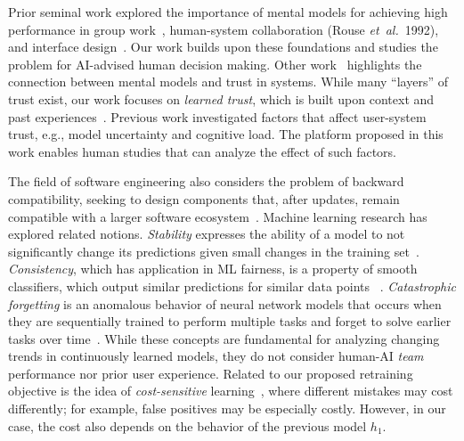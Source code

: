 \documentclass[letterpaper]{article}
\newcommand{\name}{AI-advised human decision making}
\newcommand{\hone}{\mbox{$h_1$}}
\newcommand{\etal}{\mbox{\it et al.}}
\begin{document}
Prior seminal work explored the importance of mental models for achieving high performance in group work~\cite{grosz1999evolution}, human-system collaboration (Rouse \etal\ 1992), and interface design~\cite{carroll1988mental}. Our work builds upon these foundations and studies the problem for \name.
Other work~\cite{hoff2015trust} highlights the connection between mental models and trust in systems.
While many ``layers'' of trust exist, our work focuses on {\em learned trust}, which is built upon context and past experiences~\cite{marsh2003role}.
Previous work \cite{zhou2017effects} investigated factors that affect user-system trust, e.g., model uncertainty and cognitive load. The platform proposed in this work enables human studies that can analyze the effect of such factors.


The field of software engineering also considers the problem of backward compatibility, seeking to design components that, after  updates, remain compatible with a larger software ecosystem~\cite{bosch2009software,spring2005techniques,tsantilis2009method}.
Machine learning research has explored related notions. {\em Stability} expresses the ability of a model to not significantly change its predictions given  small changes in the training set~\cite{bousquet2001algorithmic}. {\em Consistency}, which has application in ML fairness, is a property of smooth classifiers, which output similar predictions for similar data points
~\cite{zhou2004learning}. 
\emph{Catastrophic forgetting} is an anomalous behavior of neural network models that occurs when they are sequentially trained to perform multiple tasks and forget to solve earlier tasks over time~\cite{kirkpatrick2017overcoming}. 
While  these concepts are fundamental for analyzing changing trends in continuously learned models, they do not consider human-AI {\em team} performance nor prior user experience. Related to our proposed retraining objective is the idea of \emph{cost-sensitive} learning~\cite{elkan2001foundations}, where different mistakes may cost differently; for example, false positives may be especially costly. However, in our case, the cost also depends on the behavior of the previous model $\hone$.
\end{document}
